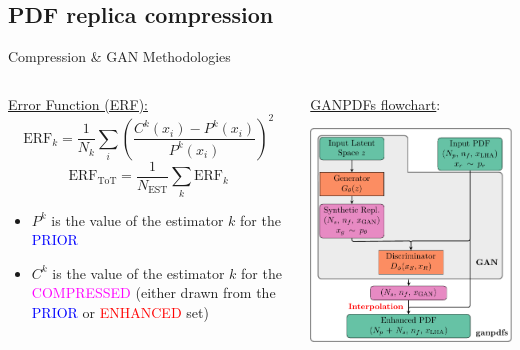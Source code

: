 \providecommand{\iRef}[1]{{\tiny\color{HallowGreen} $[$#1$]$}}

\author[Tanjona Rabemananjara]{}

\subsection{PDF replica compression}

\begin{frame}{Compression \& GAN Methodologies}
	\begin{columns}[T] 
		\begin{column}{.5\textwidth}
			\underline{Error Function (ERF):}
			\begin{equation*}
				\mathrm{ERF}_k = \frac{1}{N_k} \sum_{i}
				\left( \frac{C^{k}(x_{i}) - P^{k}(x_{i})}{P^{k}(x_{i})} \right)^2 
			\end{equation*}
			\begin{equation*}
				\mathrm{ERF}_\text{ToT} = \frac{1}{N_{\text{EST}}} \sum_{k} \mathrm{ERF}_k
			\end{equation*}
		\begin{itemize}
			\item $P^{k}$ is the value of the estimator $k$ for the \textcolor{blue}{PRIOR}
			\item $C^{k}$ is the value of the estimator $k$ for the \textcolor{magenta}{COMPRESSED}
			(either drawn from the \textcolor{blue}{PRIOR} or \textcolor{red}{ENHANCED} set)
		\end{itemize}
		\end{column}
		\hfill
		\begin{column}{.5\textwidth}	
			\underline{GANPDFs flowchart}:
			\begin{center}
				\includegraphics[height=.7\textheight]{./gan_compressor/imgs/gan-standalone.pdf}

\end{center}
\end{column}
\end{columns}
\end{frame}
